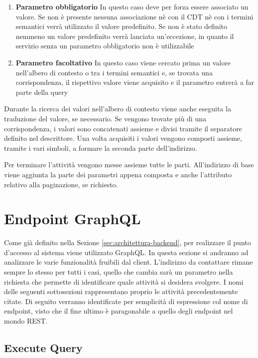 \begin{enumerate}
	\item \textbf{Parametro obbligatorio} In questo caso deve per forza essere associato un valore. Se non è presente nessuna associazione nè con il CDT nè con i termini semantici verrà utilizzato il valore predefinito. Se non è stato definito nemmeno un valore predefinito verrà lanciata un'eccezione, in quanto il servizio senza un parametro obbligatorio non è utilizzabile
	\item \textbf{Parametro facoltativo} In questo caso viene cercato prima un valore nell'albero di contesto o tra i termini semantici e, se trovata una corrispondenza, il rispettivo valore viene acquisito e il parametro entrerà a far parte della query
\end{enumerate}

Durante la ricerca dei valori nell'albero di contesto viene anche eseguita la traduzione del valore, se necessario. Se vengono trovate più di una corrispondenza, i valori sono concatenati assieme e divisi tramite il separatore definito nel descrittore. Una volta acquisiti i valori vengono composti assieme, tramite i vari simboli, a formare la seconda parte dell'indirizzo.

Per terminare l'attività vengono messe assieme tutte le parti. All'indirizzo di base viene aggiunta la parte dei parametri appena composta e anche l'attributo relativo alla paginazione, se richiesto.

\section{Endpoint GraphQL\label{sec:endpoint-graphql}}

Come già definito nella Sezione \ref{sec:architettura-backend}, per realizzare il punto d'accesso al sistema viene utilizzato GraphQL. In questa sezione si andranno ad analizzare le varie funzionalità fruibili dal client. L'indirizzo da contattare rimane sempre lo stesso per tutti i casi, quello che cambia sarà un parametro nella richiesta che permette di identificare quale attività si desidera svolgere. I nomi delle seguenti sottosezioni rappresentano proprio le attività precedentemente citate. Di seguito verranno identificate per semplicità di espressione col nome di endpoint, visto che il fine ultimo è paragonabile a quello degli endpoint nel mondo REST.

\subsection{Execute Query\label{sec:execute-query-endpoint}}

